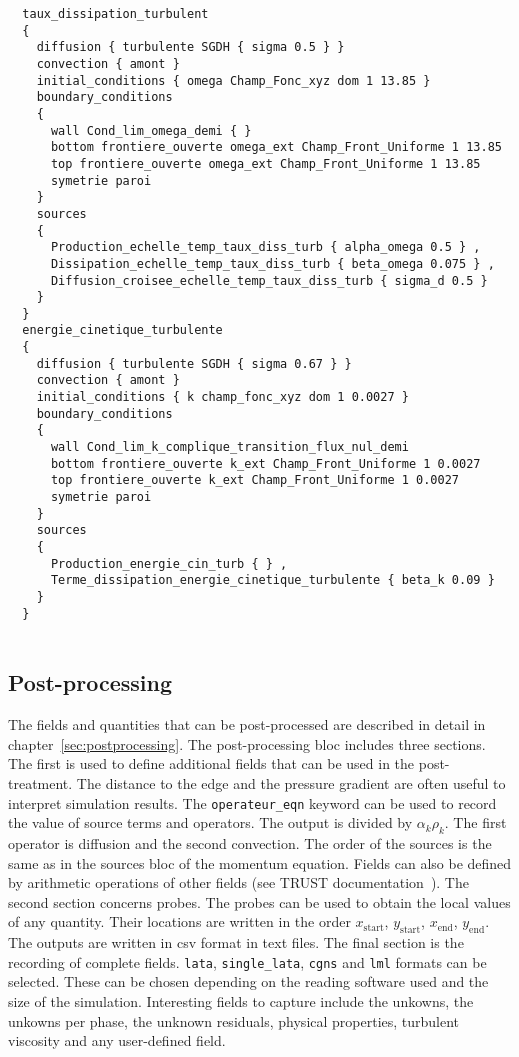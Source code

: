 \begin{lstlisting}
  taux_dissipation_turbulent
  {
    diffusion { turbulente SGDH { sigma 0.5 } }
    convection { amont }
    initial_conditions { omega Champ_Fonc_xyz dom 1 13.85 }
    boundary_conditions
    {
      wall Cond_lim_omega_demi { }
      bottom frontiere_ouverte omega_ext Champ_Front_Uniforme 1 13.85
      top frontiere_ouverte omega_ext Champ_Front_Uniforme 1 13.85
      symetrie paroi
    }
    sources
    {
      Production_echelle_temp_taux_diss_turb { alpha_omega 0.5 } ,
      Dissipation_echelle_temp_taux_diss_turb { beta_omega 0.075 } ,
      Diffusion_croisee_echelle_temp_taux_diss_turb { sigma_d 0.5 }
    }
  }
  energie_cinetique_turbulente
  {
    diffusion { turbulente SGDH { sigma 0.67 } }
    convection { amont }
    initial_conditions { k champ_fonc_xyz dom 1 0.0027 }
    boundary_conditions
    {
      wall Cond_lim_k_complique_transition_flux_nul_demi
      bottom frontiere_ouverte k_ext Champ_Front_Uniforme 1 0.0027
      top frontiere_ouverte k_ext Champ_Front_Uniforme 1 0.0027
      symetrie paroi
    }
    sources
    {
      Production_energie_cin_turb { } ,
      Terme_dissipation_energie_cinetique_turbulente { beta_k 0.09 }
    }
  }
  
\end{lstlisting}

\subsection{Post-processing}

The fields and quantities that can be post-processed are described in detail in chapter~\ref{sec:postprocessing}.
The post-processing bloc includes three sections. The first is used to define additional fields that can be used in the post-treatment. The distance to the edge and the pressure gradient are often useful to interpret simulation results. The \texttt{operateur\_eqn} keyword can be used to record the value of source terms and operators. The output is divided by $\alpha_k \rho_k$. The first operator is diffusion and the second convection. The order of the sources is the same as in the sources bloc of the momentum equation. Fields can also be defined by arithmetic operations of other fields (see TRUST documentation~\cite{trustonline}).
The second section concerns probes. 
The probes can be used to obtain the local values of any quantity. 
Their locations are written in the order $x_\text{start}$, $y_\text{start}$, $x_\text{end}$, $y_\text{end}$. 
The outputs are written in csv format in text files. 
The final section is the recording of complete fields. \texttt{lata}, \texttt{single\_lata}, \texttt{cgns} and \texttt{lml} formats can be selected. These can be chosen depending on the reading software used and the size of the simulation. Interesting fields to capture include the unkowns, the unkowns per phase, the unknown residuals, physical properties, turbulent viscosity and any user-defined field.

